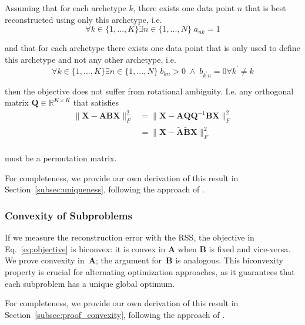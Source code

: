 \documentclass[oneside]{article}
\begin{document}
Assuming that for each archetype $k$, there exists one data point $n$ that is best reconstructed using only this archetype, i.e.
\begin{equation}
    \label{eq:cond1}
    \forall k \in \{1, ..., K\} \exists n \in \{1, ..., N\} \; a_{n k} = 1
\end{equation}

and that for each archetype there exists one data point that is only used to define this archetype and not any other archetype, i.e.
\begin{equation}
    \label{eq:cond2}
    \forall k \in \{1, ..., K\} \exists n \in \{1, ..., N\} \; b_{k n} > 0 \; \land \; b_{k^\prime n} = 0 \forall k^\prime \neq k
\end{equation}

then the objective does not suffer from rotational ambiguity. I.e. any orthogonal matrix $\mathbf{Q} \in \mathbb{R}^{K \times K}$ that satisfies
\begin{equation}
    \begin{aligned}
    \| \mathbf{X} - \mathbf{A} \mathbf{B} \mathbf{X}\|_F^2
    &= \| \mathbf{X} - \mathbf{A} \mathbf{Q} \mathbf{Q}^{-1} \mathbf{B} \mathbf{X}\|_F^2 \\
    &= \| \mathbf{X} - \tilde{\mathbf{A}} \tilde{\mathbf{B}} \mathbf{X}\|_F^2 \\
    \end{aligned}
\end{equation}

must be a permutation matrix.

For completeness, we provide our own derivation of this result in Section~\ref{subsec:uniqueness}, following the approach of \textcite{morupArchetypalAnalysisMachine2012}.

\subsubsection{Convexity of Subproblems}
\label{subsubsec:convex}

If we measure the reconstruction error with the RSS, the objective in Eq.~\eqref{eq:objective} is biconvex: it is convex in $\mathbf{A}$ when $\mathbf{B}$ is fixed and vice-versa. We prove convexity in~$\mathbf{A}$; the argument for~$\mathbf{B}$ is analogous. This biconvexity property is crucial for alternating optimization approaches, as it guarantees that each subproblem has a unique global optimum.

For completeness, we provide our own derivation of this result in Section~\ref{subsec:proof_convexity}, following the approach of \textcite{morupArchetypalAnalysisMachine2012}.
\end{document}
